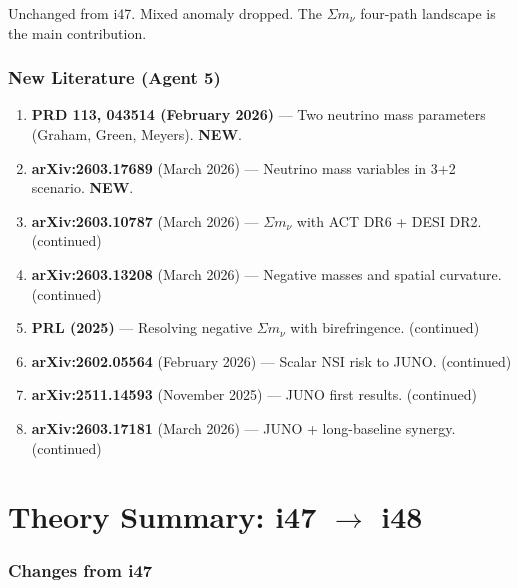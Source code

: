 \documentclass[11pt,a4paper]{article}
\newcommand{\NEW}{\textcolor{dfdblue}{\textbf{NEW}}}
\begin{document}
Unchanged from i47. Mixed anomaly dropped. The $\Sigma m_\nu$ four-path landscape is the main contribution.

\section{New Literature (Agent 5)}

\begin{enumerate}
\item \textbf{PRD 113, 043514 (February 2026)} --- Two neutrino mass parameters (Graham, Green, Meyers). \NEW.
\item \textbf{arXiv:2603.17689} (March 2026) --- Neutrino mass variables in 3+2 scenario. \NEW.
\item \textbf{arXiv:2603.10787} (March 2026) --- $\Sigma m_\nu$ with ACT DR6 + DESI DR2. (continued)
\item \textbf{arXiv:2603.13208} (March 2026) --- Negative masses and spatial curvature. (continued)
\item \textbf{PRL (2025)} --- Resolving negative $\Sigma m_\nu$ with birefringence. (continued)
\item \textbf{arXiv:2602.05564} (February 2026) --- Scalar NSI risk to JUNO. (continued)
\item \textbf{arXiv:2511.14593} (November 2025) --- JUNO first results. (continued)
\item \textbf{arXiv:2603.17181} (March 2026) --- JUNO + long-baseline synergy. (continued)
\end{enumerate}


\part{Theory Summary: i47 $\to$ i48}

\section{Changes from i47}
\end{document}
